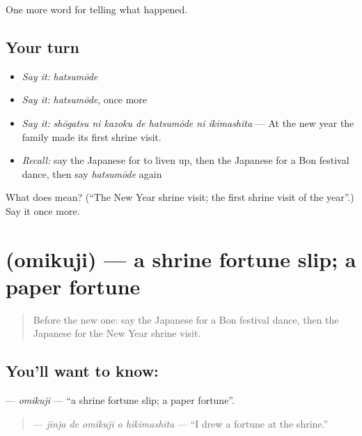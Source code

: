 \begin{grammarlens}[title={What you've built}]
One more word for telling what happened.
\end{grammarlens}

\subsection*{Your turn}
\begin{itemize}
\raggedright
  \item \emph{Say it:} \emph{hatsumōde}
  \item \emph{Say it:} \emph{hatsumōde}, once more
  \item \emph{Say it:} \emph{shōgatsu ni kazoku de hatsumōde ni ikimashita} — At the new year the family made its first shrine visit.
  \item \emph{Recall:} say the Japanese for to liven up, then the Japanese for a Bon festival dance, then say \emph{hatsumōde} again
\end{itemize}

\begin{tcolorbox}[breakable,colback=teal!4,colframe=teal!35!black,title={Before you move on}]
What does  mean? (\textquotedblleft{}The New Year shrine visit; the first shrine visit of the year\textquotedblright{}.) Say it once more.
\end{tcolorbox}
\section[\texorpdfstring{\ja{おみくじ} (omikuji)}{おみくじ (omikuji)}]{ (omikuji) — a shrine fortune slip; a paper fortune}

\label{lesson:JA-C295-omikuji}



\begin{quote}
Before the new one: say the Japanese for a Bon festival dance, then the Japanese for the New Year shrine visit.
\end{quote}

\subsection*{You'll want to know: }
\textbf{} — \emph{omikuji} — \textquotedblleft{}a shrine fortune slip; a paper fortune\textquotedblright{}.

\begin{quote}
\textbf{  } — \emph{jinja de omikuji o hikimashita} — \textquotedblleft{}I drew a fortune at the shrine.\textquotedblright{}
\end{quote}

